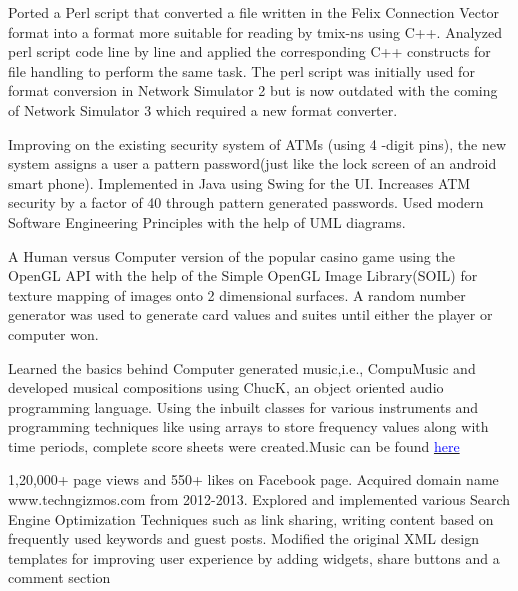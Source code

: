 \documentclass[11pt,a4paper,roman]{moderncv}        %
\begin{document}
Ported a Perl script that converted a file written in the Felix Connection Vector format into a format more suitable for reading by tmix-ns using C++. Analyzed perl script code line by line and applied the corresponding C++ constructs for file handling to perform the same task. The perl script was initially used for format conversion in Network Simulator 2 but is now outdated with the coming of Network Simulator 3 which required a new format converter.
\newline

Improving on the existing security system of ATMs (using 4 -digit pins), the new system assigns a user a pattern password(just like the lock screen of an android smart phone). Implemented in Java using Swing for the UI. Increases ATM security by a factor of 40 through pattern generated passwords. Used modern Software Engineering Principles with the help of UML diagrams.
\newline

A Human versus Computer version of the popular casino game using the OpenGL API with the help of the Simple OpenGL Image Library(SOIL) for texture mapping of images onto 2 dimensional surfaces. A random number generator was used to generate card values and suites until either the player or computer won.


Learned the basics behind Computer generated music,i.e., CompuMusic and developed musical compositions using ChucK, an object oriented audio programming language. Using the inbuilt classes for various instruments and programming techniques like using arrays to store frequency values along with time periods, complete score sheets were created.Music can be found \href{https://soundcloud.com/ujjwal-pasupulety}{\textcolor{blue}{here}}
\newline

1,20,000+ page views and 550+ likes on Facebook page. Acquired domain name www.techngizmos.com from 2012-2013. Explored and implemented various Search Engine Optimization Techniques such as link sharing, writing content based on frequently used keywords and guest posts. Modified the original XML design templates for improving user experience by adding widgets, share buttons and a comment section 
\end{document}

